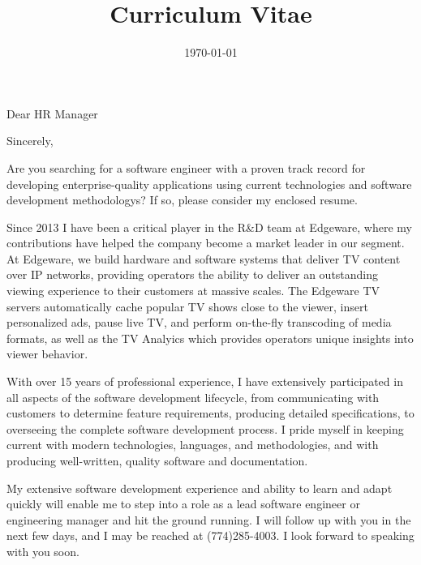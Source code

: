 \documentclass[11pt,letterpaper,roman]{moderncv} %
\title{Curriculum Vitae}
\begin{document}



\date{\today} %
\opening{Dear HR Manager} %
\closing{Sincerely,} %

\makelettertitle %

Are you searching for a software engineer with a proven track record for developing enterprise-quality applications using current technologies and software development methodologys? If so, please consider my enclosed resume.

Since 2013 I have been a critical player in the R\&D team at Edgeware, where my contributions have helped the company become a market leader in our segment.  At Edgeware, we build hardware and software systems that deliver TV content over IP networks, providing operators the ability to deliver an outstanding viewing experience to their customers at massive scales.  The Edgeware TV servers automatically cache popular TV shows close to the viewer, insert personalized ads, pause live TV, and perform on-the-fly transcoding of media formats, as well as the TV Analyics which provides operators unique insights into viewer behavior.  

With over 15 years of professional experience, I have extensively participated in all aspects of the software development lifecycle, from communicating with customers to determine feature requirements, producing detailed specifications, to overseeing the complete software development process.  I pride myself in keeping current with modern technologies, languages, and methodologies, and with producing well-written, quality software and documentation.

My extensive software development experience and ability to learn and adapt quickly will enable me to step into a role as a lead software engineer or engineering manager and hit the ground running.  I will follow up with you in the next few days, and I may be reached at (774)285-4003.  I look forward to speaking with you soon.
\end{document}
